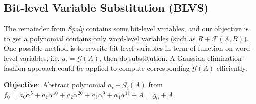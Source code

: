 \subsection{Bit-level Variable Substitution (BLVS)}
\label{sec:blvs}
The remainder from \emph{Spoly} contains some bit-level variables, and our objective is to get a polynomial contains only word-level variables
(such as $R+\mathcal{F}(A,B)$). One possible method is to rewrite bit-level variables in term of function on word-level
variables, i.e. $a_i = \mathcal{G}(A)$, then do substitution. A Gaussian-elimination-fashion approach could be applied to
compute corresponding $\mathcal{G}(A)$ efficiently.

\begin{Example}
{\bf Objective}:\ Abstract polynomial $a_i + \mathcal{G}_i(A)$ from $f_0 = a_0\alpha^5+a_1\alpha^{10}+a_2\alpha^{20}+a_3\alpha^9+a_4\alpha^{18}+A
 = g_0 + A$.


\end{Example}
